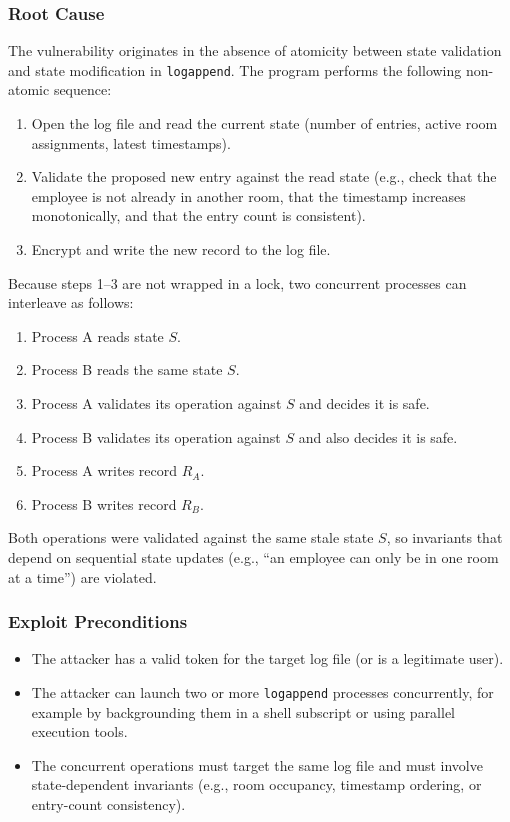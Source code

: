 \documentclass[a4paper, 12pt]{article}
\begin{document}
    \subsubsection{Root Cause}
    The vulnerability originates in the absence of atomicity between state validation and state modification in \texttt{logappend}. The program performs the following non-atomic sequence:
    \begin{enumerate}
        \item Open the log file and read the current state (number of entries, active room assignments, latest timestamps).
        \item Validate the proposed new entry against the read state (e.g., check that the employee is not already in another room, that the timestamp increases monotonically, and that the entry count is consistent).
        \item Encrypt and write the new record to the log file.
    \end{enumerate}
    Because steps 1--3 are not wrapped in a lock, two concurrent processes can interleave as follows:
    \begin{enumerate}
        \item Process A reads state $S$.
        \item Process B reads the same state $S$.
        \item Process A validates its operation against $S$ and decides it is safe.
        \item Process B validates its operation against $S$ and also decides it is safe.
        \item Process A writes record $R_A$.
        \item Process B writes record $R_B$.
    \end{enumerate}
    Both operations were validated against the same stale state $S$, so invariants that depend on sequential state updates (e.g., ``an employee can only be in one room at a time'') are violated.

    \subsubsection{Exploit Preconditions}
    \begin{itemize}
        \item The attacker has a valid token for the target log file (or is a legitimate user).
        \item The attacker can launch two or more \texttt{logappend} processes concurrently, for example by backgrounding them in a shell subscript or using parallel execution tools.
        \item The concurrent operations must target the same log file and must involve state-dependent invariants (e.g., room occupancy, timestamp ordering, or entry-count consistency).
    \end{itemize}
\end{document}
